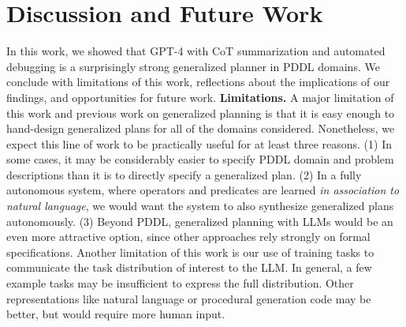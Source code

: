 \documentclass[letterpaper]{article} %
\begin{document}
\vspace{-1.51mm}
\section{Discussion and Future Work}

In this work, we showed that GPT-4 with CoT summarization and automated debugging is a surprisingly strong generalized planner in PDDL domains.
We conclude with limitations of this work, reflections about the implications of our findings, and opportunities for future work.  \textbf{Limitations.}
A major limitation of this work and previous work on generalized planning is that it is easy enough to hand-design generalized plans for all of the domains considered.
Nonetheless, we expect this line of work to be practically useful for at least three reasons.
(1) In some cases, it may be considerably easier to specify PDDL domain and problem descriptions than it is to directly specify a generalized plan.
(2) In a fully autonomous system, where operators and predicates are learned \emph{in association to natural language}, we would want the system to also synthesize generalized plans autonomously.
(3) Beyond PDDL, generalized planning with LLMs would be an even more attractive option, since other approaches rely strongly on formal specifications.
Another limitation of this work is our use of training tasks to communicate the task distribution of interest to the LLM.
In general, a few example tasks may be insufficient to express the full distribution.
Other representations like natural language or procedural generation code may be better, but would require more human input.
\end{document}
